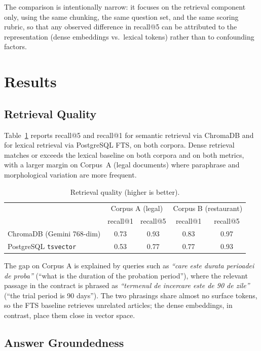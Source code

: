 The comparison is intentionally narrow: it focuses on the retrieval
component only, using the same chunking, the same question set, and
the same scoring rubric, so that any observed difference in recall@5
can be attributed to the representation (dense embeddings vs.\ lexical
tokens) rather than to confounding factors.

\section{Results}
\label{sec:results}

\subsection*{Retrieval Quality}

Table~\ref{tab:retrieval} reports recall@5 and recall@1 for semantic
retrieval via ChromaDB and for lexical retrieval via PostgreSQL FTS, on
both corpora. Dense retrieval matches or exceeds the lexical baseline
on both corpora and on both metrics, with a larger margin on
Corpus~A (legal documents) where paraphrase and morphological variation
are more frequent.

\begin{table}[h]
\centering
\caption{Retrieval quality (higher is better).}
\label{tab:retrieval}
\begin{tabular}{l c c c c}
\hline
                           & \multicolumn{2}{c}{Corpus A (legal)} & \multicolumn{2}{c}{Corpus B (restaurant)} \\
                           & recall@1 & recall@5 & recall@1 & recall@5 \\
\hline
ChromaDB (Gemini 768-dim)  & 0.73 & 0.93 & 0.83 & 0.97 \\
PostgreSQL \texttt{tsvector} & 0.53 & 0.77 & 0.77 & 0.93 \\
\hline
\end{tabular}
\end{table}

The gap on Corpus A is explained by queries such as \emph{``care este
durata perioadei de proba''} (``what is the duration of the probation
period''), where the relevant passage in the contract is phrased as
\emph{``termenul de incercare este de 90 de zile''} (``the trial
period is 90 days''). The two phrasings share almost no surface
tokens, so the FTS baseline retrieves unrelated articles; the dense
embeddings, in contrast, place them close in vector space.

\subsection*{Answer Groundedness}


